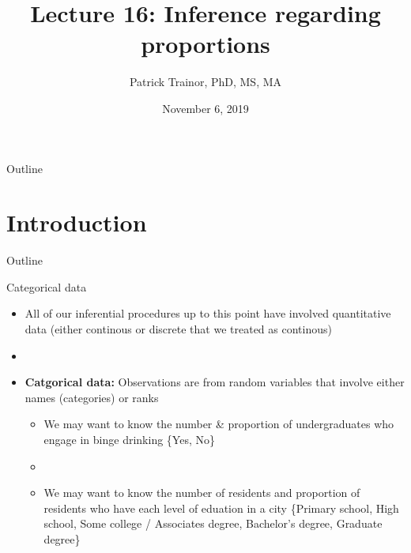 \documentclass[xcolor=dvipsnames]{beamer}
\title[Lecture 16]{Lecture 16: Inference regarding proportions}
\author[Patrick Trainor]{Patrick Trainor, PhD, MS, MA}
\institute[NMSU]{New Mexico State University}
\date{November 6, 2019}
\begin{document}
	
\begin{frame}
	\maketitle
\end{frame}

\begin{frame}{Outline}
	\tableofcontents[hideallsubsections]
\end{frame}

\section{Introduction}

\begin{frame}{Outline}
	\tableofcontents[currentsection,subsectionstyle=show/shaded/hide]
\end{frame}

\begin{frame}{Categorical data}
	\begin{itemize}
		\item All of our inferential procedures up to this point have involved quantitative data (either continous or discrete that we treated as continous) \pause
		\item[]
		\item \textbf{Catgorical data:} Observations are from random variables that involve either names (categories) or ranks \pause
		\begin{itemize}
			\item We may want to know the number \& proportion of undergraduates who engage in binge drinking \{Yes, No\} \pause
			\item[]
			\item We may want to know the number of residents and proportion of residents who have each level of eduation in a city \{Primary school, High school, Some college / Associates degree, Bachelor's degree, Graduate degree\}
		\end{itemize}
	\end{itemize}
\end{frame}
\end{document}
